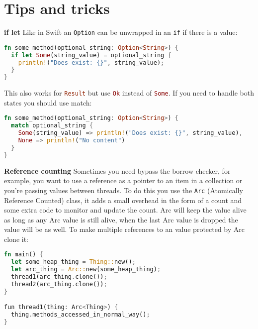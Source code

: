 \documentclass[a4paper,11pt]{article}
\begin{document}
\newpage
\section{Tips and tricks}

\textbf{if let}
\newline
Like in Swift an \lstinline[language=Kotlin]{Option} can be unwrapped in an \lstinline|if| if there is a value:

\begin{lstlisting}[language=Rust,frame=single]
fn some_method(optional_string: Option<String>) {
  if let Some(string_value) = optional_string {
    println!("Does exist: {}", string_value);
  }
}
\end{lstlisting}

This also works for \lstinline[language=Rust]{Result} but use \lstinline[language=Rust]{Ok} instead of \lstinline[language=Rust]{Some}. If you need to handle both states you should use match:
\begin{lstlisting}[language=Rust,frame=single]
fn some_method(optional_string: Option<String>) {
  match optional_string {
    Some(string_value) => println!("Does exist: {}", string_value),
    None => println!("No content")
  }
}
\end{lstlisting}
\medskip
\textbf{Reference counting}
\newline
Sometimes you need bypass the borrow checker, for example, you want to use a reference as a pointer to an item in a collection or you're passing values between threads. To do this you use the \lstinline[language=Rust]{Arc} (Atomically Reference Counted) class, it adds a small overhead in the form of a count and some extra code to monitor and update the count. Arc will keep the value alive as long as any Arc value is still alive, when the last Arc value is dropped the value will be as well. To make multiple references to an value protected by Arc clone it:
\begin{lstlisting}[language=Rust,frame=single]
fn main() {
  let some_heap_thing = Thing::new();
  let arc_thing = Arc::new(some_heap_thing);
  thread1(arc_thing.clone()); 
  thread2(arc_thing.clone()); 
}

fun thread1(thing: Arc<Thing>) {
  thing.methods_accessed_in_normal_way();
}
\end{lstlisting}
\end{document}
